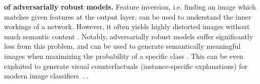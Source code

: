 \textbf{
 of adversarially robust models.}
Feature inversion, i.e. finding an image which matches given features at the output layer, can be used to understand the inner workings of a network. However, it often yields highly distorted images without much semantic content \cite{mahendran2014understanding}.
Notably, adversarially robust models suffer significantly less from this problem,
and can be used to generate semantically meaningful images when maximizing the probability of a specific class \cite{santurkar2019imagesynthesis}.
This 
can be even exploited to generate visual counterfactuals (instance-specific explanations) for modern image classifiers~\cite{augustin2020ratio, boreiko2022sparsevisual}.
.

